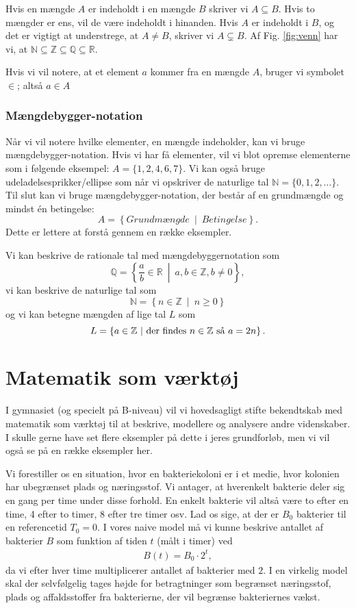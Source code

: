 Hvis en mængde $A$ er indeholdt i en mængde $B$ skriver vi $A\subseteq B$. Hvis to mængder er ens, vil de være indeholdt i hinanden. Hvis $A$ er indeholdt i $B$, og det er vigtigt at understrege, at $A \neq B$, skriver vi $A\subsetneq B$. Af Fig. \ref{fig:venn} har vi, at $\mathbb{N} \subseteq \mathbb{Z} \subseteq \mathbb{Q} \subseteq \mathbb{R}$.

Hvis vi vil notere, at et element $a$ kommer fra en mængde $A$, bruger vi symbolet $\in$; altså $a\in A$
\subsubsection*{Mængdebygger-notation}
Når vi vil notere hvilke elementer, en mængde indeholder, kan vi bruge mængdebygger-notation. Hvis vi har få elementer, vil vi blot opremse elementerne som i følgende eksempel: $A = \{1,2,4,6,7\}$. Vi kan også bruge udeladelsesprikker/ellipse som når vi opskriver de naturlige tal $\mathbb{N} = \{0,1,2,\hdots\}$. Til slut kan vi bruge mængdebygger-notation, der består af en grundmængde og mindst én betingelse:
\[
A = \left\{ \textit{Grundmængde}\ \middle| \  \textit{Betingelse} \right\}.
\]
Dette er lettere at forstå gennem en række eksempler.
\begin{exa} \label{exa:setbuilder}
Vi kan beskrive de rationale tal med mængdebyggernotation som 
\[
\mathbb{Q} = \left\{\frac{a}{b} \in \mathbb{R}\ \middle| \ a,b\in \mathbb{Z}, b\neq 0 \right\},
\]
vi kan beskrive de naturlige tal som 
\[
\mathbb{N} = \left\{n\in \mathbb{Z} \ \middle| \ n\geq 0 \right\}
\]
og vi kan betegne mængden af lige tal $L$ som
\[
L = \left\{a \in \mathbb{Z} \ \middle| \  \textnormal{der findes }n\in \mathbb{Z} \textnormal{ så }a=2n \right\}.
\]
\end{exa}


\section*{Matematik som værktøj}
I gymnasiet (og specielt på B-niveau) vil vi hovedsagligt stifte bekendtskab med matematik som værktøj til at beskrive, modellere og analysere andre videnskaber. I skulle gerne have set flere eksempler på dette i jeres grundforløb, men vi vil også se på en række eksempler her. 
\begin{exa}
Vi forestiller os en situation, hvor en bakteriekoloni er i et medie, hvor kolonien har ubegrænset plads og næringsstof. Vi antager, at hverenkelt bakterie deler sig en gang per time under disse forhold. En enkelt bakterie vil altså være to efter en time, 4 efter to timer, 8 efter tre timer osv. Lad os sige, at der er $B_0$ bakterier til en referencetid $T_0=0$. I vores naive model må vi kunne beskrive antallet af bakterier $B$ som funktion af tiden $t$ (målt i timer) ved 
\begin{align*}
B(t) = B_0\cdot 2^t,
\end{align*}
da vi efter hver time multiplicerer antallet af bakterier med $2$. I en virkelig model skal der selvfølgelig tages højde for betragtninger som begrænset næringsstof, plads og affaldsstoffer fra bakterierne, der vil begrænse bakteriernes vækst.
\end{exa}

